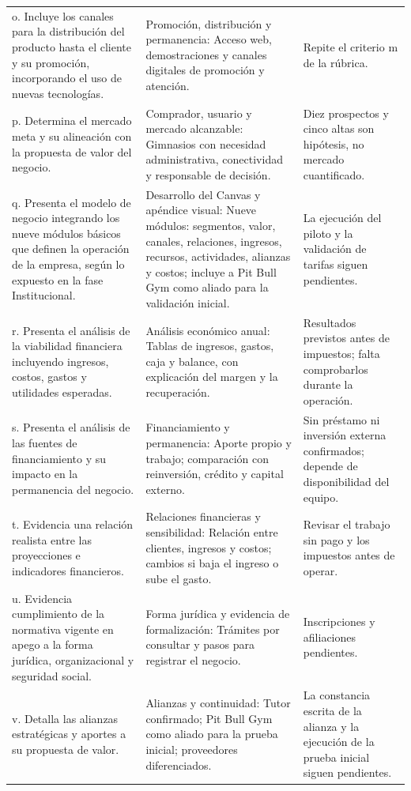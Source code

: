 \begin{longtable}{p{4.0cm}p{5.6cm}p{4.2cm}}
o. Incluye los canales para la distribución del producto hasta el cliente y su promoción, incorporando el uso de nuevas tecnologías. & Promoción, distribución y permanencia: Acceso web, demostraciones y canales digitales de promoción y atención. & Repite el criterio m de la rúbrica. \\
p. Determina el mercado meta y su alineación con la propuesta de valor del negocio. & Comprador, usuario y mercado alcanzable: Gimnasios con necesidad administrativa, conectividad y responsable de decisión. & Diez prospectos y cinco altas son hipótesis, no mercado cuantificado. \\
q. Presenta el modelo de negocio integrando los nueve módulos básicos que definen la operación de la empresa, según lo expuesto en la fase Institucional. & Desarrollo del Canvas y apéndice visual: Nueve módulos: segmentos, valor, canales, relaciones, ingresos, recursos, actividades, alianzas y costos; incluye a Pit Bull Gym como aliado para la validación inicial. & La ejecución del piloto y la validación de tarifas siguen pendientes. \\
r. Presenta el análisis de la viabilidad financiera incluyendo ingresos, costos, gastos y utilidades esperadas. & Análisis económico anual: Tablas de ingresos, gastos, caja y balance, con explicación del margen y la recuperación. & Resultados previstos antes de impuestos; falta comprobarlos durante la operación. \\
s. Presenta el análisis de las fuentes de financiamiento y su impacto en la permanencia del negocio. & Financiamiento y permanencia: Aporte propio y trabajo; comparación con reinversión, crédito y capital externo. & Sin préstamo ni inversión externa confirmados; depende de disponibilidad del equipo. \\
t. Evidencia una relación realista entre las proyecciones e indicadores financieros. & Relaciones financieras y sensibilidad: Relación entre clientes, ingresos y costos; cambios si baja el ingreso o sube el gasto. & Revisar el trabajo sin pago y los impuestos antes de operar. \\
u. Evidencia cumplimiento de la normativa vigente en apego a la forma jurídica, organizacional y seguridad social. & Forma jurídica y evidencia de formalización: Trámites por consultar y pasos para registrar el negocio. & Inscripciones y afiliaciones pendientes. \\
v. Detalla las alianzas estratégicas y aportes a su propuesta de valor. & Alianzas y continuidad: Tutor confirmado; Pit Bull Gym como aliado para la prueba inicial; proveedores diferenciados. & La constancia escrita de la alianza y la ejecución de la prueba inicial siguen pendientes. \\

\end{longtable}
